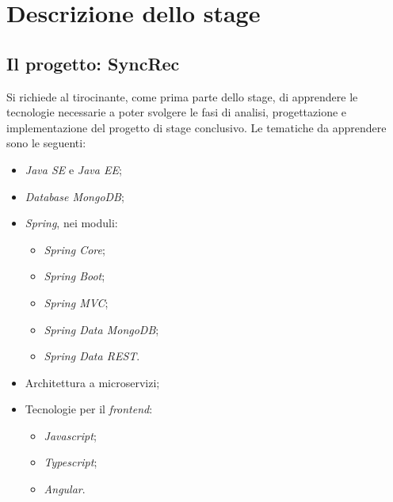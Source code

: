
\chapter{Descrizione dello stage}\label{cap:descrizione-stage}



\section{Il progetto: SyncRec}

Si richiede al tirocinante, come prima parte dello stage, di apprendere le tecnologie necessarie a poter svolgere le fasi di analisi, progettazione e implementazione del progetto di stage conclusivo.
Le tematiche da apprendere sono le seguenti:
\begin{itemize}
	\item \textit{Java SE} e \textit{Java EE};
	\item \textit{Database MongoDB};
	\item \textit{Spring}, nei moduli:
	\begin{itemize}[noitemsep]
		\item \textit{Spring Core};
		\item \textit{Spring Boot};
		\item \textit{Spring MVC};
		\item \textit{Spring Data MongoDB};
		\item \textit{Spring Data REST}.
	\end{itemize}
	\item Architettura a microservizi;
	\item Tecnologie per il \textit{frontend}:
	\begin{itemize}[noitemsep]
		\item \textit{Javascript};
		\item \textit{Typescript};
		\item \textit{Angular}.
	\end{itemize}
\end{itemize}

